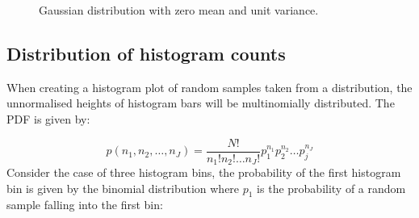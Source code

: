 \documentclass[12pt]{article}
\begin{document}
\begin{figure}[H]
  \caption{Gaussian distribution with zero mean and unit variance.}
  \label{fig:gaussian-pdf}
\end{figure}

\subsection{Distribution of histogram counts}

When creating a histogram plot of random samples taken from a distribution, the unnormalised heights of histogram bars will be multinomially distributed. The PDF is given by:

\begin{equation}
    p(n_1, n_2, \ldots, n_J) = \frac {N!} {n_1! n_2! \ldots n_J!} p_1^{n_1} p_2^{n_2} \ldots p_j^{n_J}
\end{equation}
Consider the case of three histogram bins, the probability of the first histogram bin is given by the binomial distribution where $p_1$ is the probability of a random sample falling into the first bin:
\end{document}
